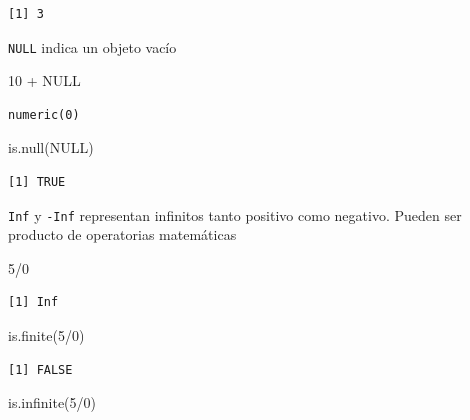 \documentclass[
  letterpaper,
  DIV=11,
  numbers=noendperiod]{scrartcl}
\newenvironment{Shaded}{\begin{snugshade}}{\end{snugshade}}
\newcommand{\ConstantTok}[1]{\textcolor[rgb]{0.56,0.35,0.01}{#1}}
\newcommand{\DecValTok}[1]{\textcolor[rgb]{0.68,0.00,0.00}{#1}}
\newcommand{\FunctionTok}[1]{\textcolor[rgb]{0.28,0.35,0.67}{#1}}
\newcommand{\NormalTok}[1]{\textcolor[rgb]{0.00,0.23,0.31}{#1}}
\newcommand{\SpecialCharTok}[1]{\textcolor[rgb]{0.37,0.37,0.37}{#1}}
\begin{document}
\begin{verbatim}
[1] 3
\end{verbatim}

\texttt{NULL} indica un objeto vacío

\begin{Shaded}
\begin{Highlighting}[]
\DecValTok{10} \SpecialCharTok{+} \ConstantTok{NULL}     
\end{Highlighting}
\end{Shaded}

\begin{verbatim}
numeric(0)
\end{verbatim}

\begin{Shaded}
\begin{Highlighting}[]
\FunctionTok{is.null}\NormalTok{(}\ConstantTok{NULL}\NormalTok{) }
\end{Highlighting}
\end{Shaded}

\begin{verbatim}
[1] TRUE
\end{verbatim}

\texttt{Inf} y \texttt{-Inf} representan infinitos tanto positivo como
negativo. Pueden ser producto de operatorias matemáticas

\begin{Shaded}
\begin{Highlighting}[]
\DecValTok{5}\SpecialCharTok{/}\DecValTok{0}
\end{Highlighting}
\end{Shaded}

\begin{verbatim}
[1] Inf
\end{verbatim}

\begin{Shaded}
\begin{Highlighting}[]
\FunctionTok{is.finite}\NormalTok{(}\DecValTok{5}\SpecialCharTok{/}\DecValTok{0}\NormalTok{) }
\end{Highlighting}
\end{Shaded}

\begin{verbatim}
[1] FALSE
\end{verbatim}

\begin{Shaded}
\begin{Highlighting}[]
\FunctionTok{is.infinite}\NormalTok{(}\DecValTok{5}\SpecialCharTok{/}\DecValTok{0}\NormalTok{) }
\end{Highlighting}
\end{Shaded}
\end{document}
